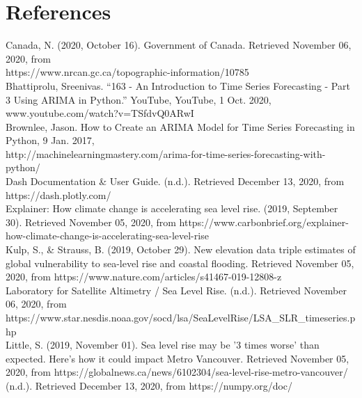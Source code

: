 \documentclass[fontsize=11pt]{article}
\begin{document}
    \section*{References}
    \begin{hangparas}{.25in}{1}
        Canada, N. (2020, October 16). Government of Canada. Retrieved November 06, 2020, from \\ https://www.nrcan.gc.ca/topographic-information/10785 \\

        Bhattiprolu, Sreenivas. “163 - An Introduction to Time Series Forecasting - Part 3 Using ARIMA in Python.” YouTube,
        YouTube, 1 Oct. 2020, www.youtube.com/watch?v=TSfdvQ0ARwI \\

        Brownlee, Jason. How to Create an ARIMA Model for Time Series Forecasting in Python, 9 Jan. 2017, \\
        http://machinelearningmastery.com/arima-for-time-series-forecasting-with-python/ \\

        Dash Documentation & User Guide. (n.d.). Retrieved December 13, 2020, from https://dash.plotly.com/ \\

        Explainer: How climate change is accelerating sea level rise. (2019, September 30). Retrieved November 05, 2020, from https://www.carbonbrief.org/explainer-how-climate-change-is-accelerating-sea-level-rise \\

        Kulp, S., & Strauss, B. (2019, October 29). New elevation data triple estimates of global vulnerability to sea-level rise and coastal flooding. Retrieved November 05, 2020, from https://www.nature.com/articles/s41467-019-12808-z \\

        Laboratory for Satellite Altimetry / Sea Level Rise. (n.d.).
        Retrieved November 06, 2020, from \\ https://www.star.nesdis.noaa.gov/socd/lsa/SeaLevelRise/LSA\_SLR\_timeseries.php \\

        Little, S. (2019, November 01). Sea level rise may be '3 times worse' than expected. Here's how it could impact Metro Vancouver. Retrieved November 05, 2020, from https://globalnews.ca/news/6102304/sea-level-rise-metro-vancouver/\\

        (n.d.). Retrieved December 13, 2020, from https://numpy.org/doc/ \\


\end{hangparas}
\end{document}
